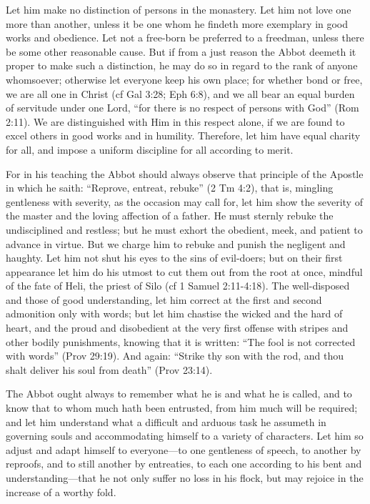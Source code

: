 Let him make no distinction of persons in the monastery. Let him not love one more than another, unless it be one whom he findeth more exemplary in good works and obedience. Let not a free-born be preferred to a freedman, unless there be some other reasonable cause. But if from a just reason the Abbot deemeth it proper to make such a distinction, he may do so in regard to the rank of anyone whomsoever; otherwise let everyone keep his own place; for whether bond or free, we are all one in Christ (cf Gal 3:28; Eph 6:8), and we all bear an equal burden of servitude under one Lord, ``for there is no respect of persons with God'' (Rom 2:11). We are distinguished with Him in this respect alone, if we are found to excel others in good works and in humility. Therefore, let him have equal charity for all, and impose a uniform discipline for all according to merit.

For in his teaching the Abbot should always observe that principle of the Apostle in which he saith: ``Reprove, entreat, rebuke'' (2 Tm 4:2), that is, mingling gentleness with severity, as the occasion may call for, let him show the severity of the master and the loving affection of a father. He must sternly rebuke the undisciplined and restless; but he must exhort the obedient, meek, and patient to advance in virtue. But we charge him to rebuke and punish the negligent and haughty. Let him not shut his eyes to the sins of evil-doers; but on their first appearance let him do his utmost to cut them out from the root at once, mindful of the fate of Heli, the priest of Silo (cf 1 Samuel 2:11-4:18). The well-disposed and those of good understanding, let him correct at the first and second admonition only with words; but let him chastise the wicked and the hard of heart, and the proud and disobedient at the very first offense with stripes and other bodily punishments, knowing that it is written: ``The fool is not corrected with words'' (Prov 29:19). And again: ``Strike thy son with the rod, and thou shalt deliver his soul from death'' (Prov 23:14).

The Abbot ought always to remember what he is and what he is called, and to know that to whom much hath been entrusted, from him much will be required; and let him understand what a difficult and arduous task he assumeth in governing souls and accommodating himself to a variety of characters. Let him so adjust and adapt himself to everyone—to one gentleness of speech, to another by reproofs, and to still another by entreaties, to each one according to his bent and understanding—that he not only suffer no loss in his flock, but may rejoice in the increase of a worthy fold.

